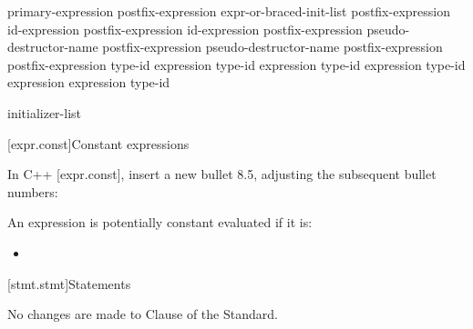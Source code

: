 \begin{std.txt}
\begin{bnf}
\br
    primary-expression\br
    postfix-expression \terminal{[} expr-or-braced-init-list \terminal{]}\br
    \br
    \br
    \br
    \br
    \br
    \br
    \br
    postfix-expression  id-expression\br
    postfix-expression  id-expression\br
    postfix-expression  pseudo-destructor-name\br
    postfix-expression \terminal{->} pseudo-destructor-name\br
    postfix-expression \terminal{++}\br
    postfix-expression \terminal{-{-}}\br
     type-id \terminal{> (} expression \terminal{)}\br
     type-id \terminal{> (} expression \terminal{)}\br
     type-id \terminal{> (} expression \terminal{)}\br
     type-id \terminal{> (} expression \terminal{)}\br
     expression \terminal{)}\br
     type-id \terminal{)}
\end{bnf}
\begin{bnf}
\br
    \br
\end{bnf}
\begin{bnf}
\br
    \br
    \br
    \br
    \br
\end{bnf}
\begin{bnf}
\br
    initializer-list\br
\end{bnf}
\end{std.txt}

[expr.const]{Constant expressions}

In C++ [expr.const], insert a new bullet 8.5, adjusting the subsequent bullet numbers:

\setcounter{Paras}{7}
\setcounter{Bullets1}{4}

\begin{std.txt}
\pnum
An expression is potentially constant evaluated if it is: \newline
[...]
\begin{itemize}
\setcounter{Bullets1}{4}
  \item {}
\end{itemize}
\end{std.txt}

[stmt.stmt]{Statements}

No changes are made to Clause \the\value{chapter} of the \Cpp Standard.
